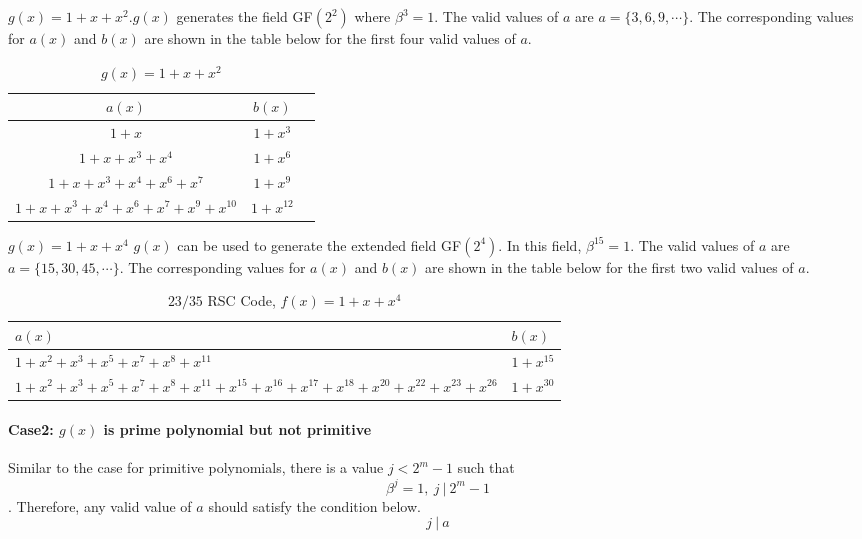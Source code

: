 \begin{example}
$g(x)=1+x+x^2$.\newline $g(x)$ generates the field GF$(2^2)$ where $\beta^{3}=1$. The valid values of $a$ are $a=\{3,6,9,\cdots \}$. The corresponding values for $a(x)$ and $b(x)$ are shown in the table below for the first four valid values of $a$.

 \begin{table*}[h]
 \caption{$g(x)=1+x+x^2$}
\centering
 \begin{tabular}{c c c} 
 \hline
 $a(x)$ & $b(x)$ \\ [0.5ex] 
 \hline\hline
$1+x$
 & $1+x^{3}$ \\
\hline
$1+x+x^3+x^4$
 & $1+x^{6}$ 
 \\
\hline
$1+x+x^3+x^4+x^6+x^{7}$ 
&  $1+x^{9}$ 
\\
\hline
$1+x+x^3+x^4+x^6+x^{7}+x^9+x^{10}$
 &  $1+x^{12}$ \\
 \end{tabular}
 \label{novelTab2}
\end{table*}
\end{example}

\begin{example}$g(x)=1+x+x^4$\newline
$g(x)$ can be used to generate the extended field GF$(2^4)$. In this field, $\beta^{15}=1$. The valid values of $a$ are $a=\{15,30,45,\cdots \}$. The corresponding values for $a(x)$ and $b(x)$ are shown in the table below for the first two valid values of $a$.

 \begin{table*}[h!]
 \caption{$23/35$ RSC Code, $f(x)=1+x+x^4$}
\centering
\begin{tabular}{p{7cm} | p{7cm}} 
 \hline
 $a(x)$ & $b(x)$  \\ [0.5ex] 
 \hline\hline
$1+x^2+x^3+x^5+x^7+x^8+x^{11}$ 
& $1+x^{15}$ \\ 
\hline
$1+x^2+x^3+x^5+x^7+x^8+x^{11}+x^{15}+x^{16}+x^{17}+x^{18}+x^{20}+x^{22}+x^{23}+x^{26}$ 
&$1+x^{30}$\\
 \end{tabular}
 \label{novelTab5}
\end{table*}

\end{example}
\paragraph{ Case2: $g(x)$ is prime polynomial but not primitive \newline}
Similar to the case for primitive polynomials, there is a value $j < 2^m-1$ such that 
$$\beta^j=1,~j~|~2^{m}-1 $$. Therefore, any valid value of $a$ should satisfy the condition below.
$$j~|~a$$

